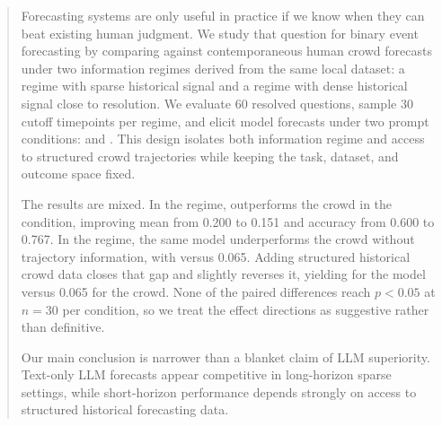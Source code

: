 \begin{abstract}
Forecasting systems are only useful in practice if we know when they can beat existing human judgment. We study that question for binary event forecasting by comparing \gptmodel against contemporaneous human crowd forecasts under two information regimes derived from the same local dataset: a \longterm regime with sparse historical signal and a \shortterm regime with dense historical signal close to resolution. We evaluate 60 resolved questions, sample 30 cutoff timepoints per regime, and elicit model forecasts under two prompt conditions: \questiononly and \withhistory. This design isolates both information regime and access to structured crowd trajectories while keeping the task, dataset, and outcome space fixed.

The results are mixed. In the \longterm regime, \gptmodel outperforms the crowd in the \questiononly condition, improving mean \brier from 0.200 to 0.151 and accuracy from 0.600 to 0.767. In the \shortterm regime, the same model underperforms the crowd without trajectory information, with  versus 0.065. Adding structured historical crowd data closes that gap and slightly reverses it, yielding  for the model versus 0.065 for the crowd. None of the paired \brier differences reach $p<0.05$ at $n=30$ per condition, so we treat the effect directions as suggestive rather than definitive.

Our main conclusion is narrower than a blanket claim of LLM superiority. Text-only LLM forecasts appear competitive in long-horizon sparse settings, while short-horizon performance depends strongly on access to structured historical forecasting data.
\end{abstract}

